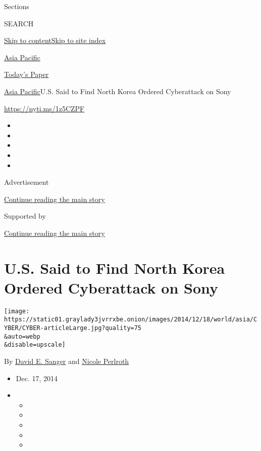Sections

SEARCH

\protect\hyperlink{site-content}{Skip to
content}\protect\hyperlink{site-index}{Skip to site index}

\href{https://www.nytimes3xbfgragh.onion/section/world/asia}{Asia
Pacific}

\href{https://myaccount.nytimes3xbfgragh.onion/auth/login?response_type=cookie\&client_id=vi}{}

\href{https://www.nytimes3xbfgragh.onion/section/todayspaper}{Today's
Paper}

\href{/section/world/asia}{Asia Pacific}\textbar{}U.S. Said to Find
North Korea Ordered Cyberattack on Sony

\url{https://nyti.ms/1z5CZPF}

\begin{itemize}
\item
\item
\item
\item
\item
\end{itemize}

Advertisement

\protect\hyperlink{after-top}{Continue reading the main story}

Supported by

\protect\hyperlink{after-sponsor}{Continue reading the main story}

\hypertarget{us-said-to-find-north-korea-ordered-cyberattack-on-sony}{%
\section{U.S. Said to Find North Korea Ordered Cyberattack on
Sony}\label{us-said-to-find-north-korea-ordered-cyberattack-on-sony}}

\texttt{[image: https://static01.graylady3jvrrxbe.onion/images/2014/12/18/world/asia/CYBER/CYBER-articleLarge.jpg?quality=75\\\&auto=webp\\\&disable=upscale]}

By \href{http://www.nytimes3xbfgragh.onion/by/david-e-sanger}{David E.
Sanger} and
\href{http://www.nytimes3xbfgragh.onion/by/nicole-perlroth}{Nicole
Perlroth}

\begin{itemize}
\item
  Dec. 17, 2014
\item
  \begin{itemize}
  \item
  \item
  \item
  \item
  \item
  \end{itemize}
\end{itemize}

